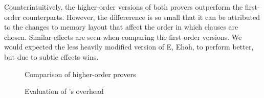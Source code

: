   Counterintuitively, the higher-order versions of both provers outperform
  the first-order counterparts. However, the differerence is so small that it can
  be attributed to the changes to memory layout that affect the order in which
  clauses are chosen. Similar effects are seen when comparing the first-order versions.
  We would expected the less heavily modified version of E, Ehoh, to perform better,
  but due to subtle effects \ehohii{} wins.
  
  
  \begin{figure}[t]
    \noindent\hbox{}\hfill
    \begin{minipage}[ht!]{.66\linewidth}
      \centering
      \def\arraystretch{1.1}%
      \caption{Comparison of higher-order provers}
      \label{fig:all-provers}
    \end{minipage}\hfill\hfill
    \begin{minipage}[ht!]{.30\linewidth}
      \centering
      \def\arraystretch{1.1}%
      \caption{Evaluation of \ehohii{}'s overhead}
      \label{fig:ehoh}
    \end{minipage}\hfill\hfill
  \end{figure}
  

